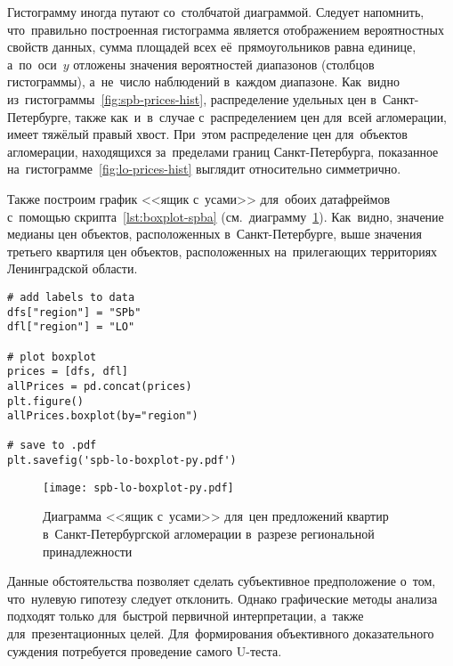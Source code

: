 \documentclass[]{scrartcl}
\begin{document}
Гистограмму иногда путают со~столбчатой диаграммой. Следует напомнить, что~правильно построенная гистограмма является отображением вероятностных свойств данных, сумма площадей всех её~прямоугольников равна единице, а~по~оси~$y$ отложены значения вероятностей диапазонов (столбцов гистограммы), а~не~число наблюдений в~каждом диапазоне. Как~видно из~гистограммы~\ref{fig:spb-prices-hist}, распределение удельных цен в~Санкт-Петербурге, также как~и~в~случае с~распределением цен для~всей агломерации, имеет тяжёлый правый хвост. При~этом распределение цен для~объектов агломерации, находящихся за~пределами границ Санкт-Петербурга, показанное на~гистограмме~\ref{fig:lo-prices-hist} выглядит относительно симметрично.

Также построим график <<ящик с~усами>> для~обоих датафреймов с~помощью скрипта~\ref{lst:boxplot-spba} (см.~диаграмму~\ref{fig:spb-lo-boxplot-py}). Как~видно, значение медианы цен объектов, расположенных в~Санкт-Петербурге, выше значения третьего квартиля цен объектов, расположенных на~прилегающих территориях Ленинградской области.
%
\begin{lstlisting}[float, caption = Построение диаграммы <<ящик с~усами>>~(boxplot) для~обеих подвыборок, firstnumber=1, label= lst:boxplot-spba]
# add labels to data
dfs["region"] = "SPb"
dfl["region"] = "LO"

# plot boxplot
prices = [dfs, dfl]
allPrices = pd.concat(prices)
plt.figure()
allPrices.boxplot(by="region")

# save to .pdf
plt.savefig('spb-lo-boxplot-py.pdf')
\end{lstlisting} 
%
\begin{figure}[ht]
	\centering
	\texttt{[image: spb-lo-boxplot-py.pdf]}
	\caption{Диаграмма <<ящик с~усами>> для~цен предложений квартир в~Санкт-Петербургской агломерации в~разрезе региональной принадлежности}
	\label{fig:spb-lo-boxplot-py}
\end{figure}
%

Данные обстоятельства позволяет сделать субъективное предположение о~том, что~нулевую гипотезу следует отклонить. Однако графические методы анализа подходят только для~быстрой первичной интерпретации, а~также для~презентационных целей. Для~формирования объективного доказательного суждения потребуется проведение самого U-теста. 
\end{document}
